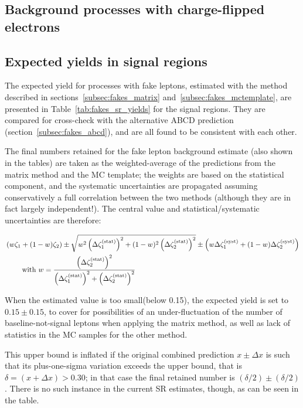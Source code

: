 \subsection{Background processes with charge-flipped electrons}


\subsection{Expected yields in signal regions}
\label{subsec:fakes_yields}

The expected yield for processes with fake leptons, 
estimated with the method described in sections~\ref{subsec:fakes_matrix} and~\ref{subsec:fakes_mctemplate}, 
are presented in Table~\ref{tab:fakes_sr_yields} for the signal regions. 
They are compared for cross-check with the alternative ABCD prediction (section~\ref{subsec:fakes_abcd}), 
and are all found to be consistent with each other. 

The final numbers retained for the fake lepton background estimate (also shown in the tables) 
are taken as the weighted-average of the predictions from the matrix method and the MC template; 
the weights are based on the statistical component, and the systematic uncertainties are propagated 
assuming conservatively a full correlation between the two methods (although they are in fact largely independent!). 
The central value and statistical/systematic uncertainties are therefore: 

\begin{align}
&\left(w\zeta_1 + (1-w)\zeta_2\right) 
\pm \sqrt{w^2\left(\Delta\zeta_1^\text{(stat)}\right)^2 + (1-w)^2\left(\Delta\zeta_2^\text{(stat)}\right)^2} 
\pm \left(w\Delta\zeta_1^\text{(syst)} + (1-w)\Delta\zeta_2^\text{(syst)}\right)\\
&\qquad\text{ with }w=\frac{\left(\Delta\zeta_2^\text{(stat)}\right)^2}{\left(\Delta\zeta_1^\text{(stat)}\right)^2+\left(\Delta\zeta_2^\text{(stat)}\right)^2}\notag
\end{align}

When the estimated value is too small(below 0.15), the expected yield is set to $0.15\pm 0.15$, 
to cover for possibilities of an under-fluctuation of the number of baseline-not-signal leptons 
when applying the matrix method, as well as lack of statistics in the MC samples for the other method. 
 
This upper bound is inflated if the original combined prediction $x\pm\Delta x$ 
is such that its plus-one-sigma variation exceeds the upper bound, that is $\delta=(x+\Delta x)>0.30$; 
in that case the final retained number is $(\delta/2)\pm (\delta/2)$. 
There is no such instance in the current SR estimates, though, as can be seen in the table.  

